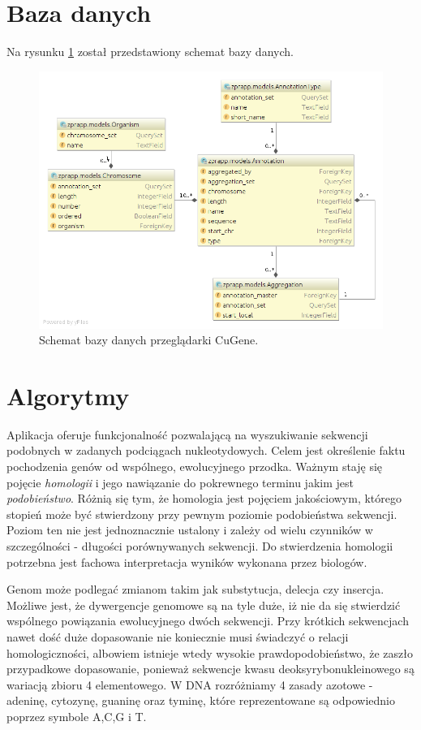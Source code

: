 \section{Baza danych}
Na rysunku \ref{img:db_model} został przedstawiony schemat bazy danych.
\begin{figure}[h]
	\centering
	\includegraphics[width=1\textwidth]{img/db_model.png}
	\caption{Schemat bazy danych przeglądarki CuGene.}
	\label{img:db_model}
\end{figure}


\section{Algorytmy}
Aplikacja oferuje funkcjonalność pozwalającą na wyszukiwanie sekwencji podobnych w zadanych podciągach nukleotydowych.
Celem jest określenie faktu pochodzenia genów od wspólnego, ewolucyjnego przodka.
Ważnym staję się pojęcie \textit{homologii} i jego nawiązanie do pokrewnego terminu jakim jest \textit{podobieństwo}.
Różnią się tym, że homologia jest pojęciem jakościowym, którego stopień może być stwierdzony przy pewnym poziomie podobieństwa sekwencji.
Poziom ten nie jest jednoznacznie ustalony i zależy od wielu czynników w szczególności - długości porównywanych sekwencji.
Do stwierdzenia homologii potrzebna jest fachowa interpretacja wyników wykonana przez biologów.

Genom może podlegać zmianom takim jak substytucja, delecja czy insercja.
Możliwe jest, że dywergencje genomowe są na tyle duże, iż nie da się stwierdzić wspólnego powiązania ewolucyjnego dwóch sekwencji.
Przy krótkich sekwencjach nawet dość duże dopasowanie nie koniecznie musi świadczyć o relacji homologiczności, albowiem istnieje wtedy wysokie prawdopodobieństwo, że zaszło przypadkowe dopasowanie, ponieważ sekwencje kwasu deoksyrybonukleinowego są wariacją zbioru 4 elementowego. W DNA rozróżniamy 4 zasady azotowe - adeninę, cytozynę, guaninę oraz tyminę, które reprezentowane są odpowiednio poprzez symbole A,C,G i T.


